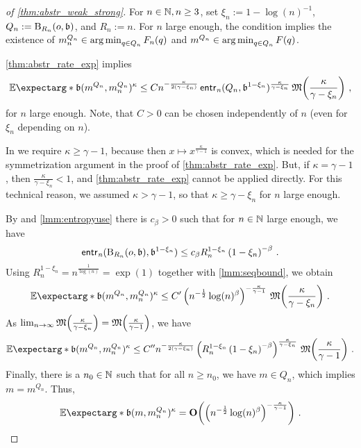 \begin{proof}[of \autoref{thm:abstr_weak_strong}]
	For $n\in\mathbb{N}, n\geq 3$, set $\xi_n := 1 - \log(n)^{-1}$, $Q_n := \operatorname{\mathrm{B}}_{R_n}(o, \mathfrak{b})$, and $R_n := n$.
	For $n$ large enough, the  condition implies the existence of $m^{Q_n}_n \in \operatorname*{arg\,min}_{q\in Q_n} F_n(q)$ and $m^{Q_n}\in\operatorname*{arg\,min}_{q\in Q_n} F(q)$.
	
	\autoref{thm:abstr_rate_exp} implies
	\begin{equation*}
		\Ex*{\mf b(m^{Q_n}, m^{Q_n}_n)^{\kappa}} \leq C n^{-\frac{\kappa}{2(\gamma-\xi_n)}} \entrn(Q_n, \mf b^{1-\xi_n})^{\frac{\kappa}{\gamma-\xi_n}}\, \mf M\brOf{\frac{\kappa}{\gamma-\xi_n}}
		\eqcm
	\end{equation*}
	for $n$ large enough.
	Note, that $C>0$ can be chosen independently of $n$ (even for $\xi_n$ depending on $n$).
	
	In  we require $\kappa \geq \gamma-1$, because then $x\mapsto x^{\frac{\kappa}{\gamma-1}}$ is convex, which is needed for the symmetrization argument in the proof of \autoref{thm:abstr_rate_exp}. But, if $\kappa = \gamma-1$, then $\frac{\kappa}{\gamma-\xi_n} < 1$, and \autoref{thm:abstr_rate_exp} cannot be applied directly. For this technical reason, we assumed $\kappa > \gamma-1$, so that $\kappa \geq \gamma-\xi_n$ for $n$ large enough.	
	
	By  and \autoref{lmm:entropyuse} there is $c_\beta>0$ such that for $n\in\mathbb{N}$ large enough, we have 
	\begin{equation*}
		\operatorname{\mathsf{entr}_\mathit{n}}(\operatorname{\mathrm{B}}_{R_n}(o,\mathfrak{b}), \mathfrak{b}^{1-\xi_n}) \leq c_\beta R_n^{1-\xi_n} \left( {1-\xi_n} \right)^{-\beta}
		\, .
	\end{equation*}
	Using $R_n^{1-\xi_n} = n^{\frac1{\log(n)}} = \exp(1)$ together with \autoref{lmm:seqbound}, we obtain
	\begin{equation*}
		\Ex*{\mf b(m^{Q_n}, m^{Q_n}_n)^\kappa} \leq C\pr \br{n^{-\frac12} \log(n)^\beta}^{-\frac{\kappa}{\gamma-1}} \, \mf M\brOf{\frac{\kappa}{\gamma-\xi_n}}
		\eqfs
	\end{equation*}
	As $\lim_{n\to\infty}\mathfrak{M}\!\left( \frac{\kappa}{\gamma-\xi_n} \right) = \mathfrak{M}\!\left( \frac{\kappa}{\gamma-1} \right)$, we have 
	\begin{equation*}
		\Ex*{\mf b(m^{Q_n}, m^{Q_n}_n)^{\kappa}} \leq C\prr n^{-\frac{\kappa}{2(\gamma-\xi_n)}} \br{R_n^{1-\xi_n} \br{{1-\xi_n}}^{-\beta}}^{\frac{\kappa}{\gamma-\xi_n}}\, \mf M\brOf{\frac{\kappa}{\gamma-1}}
		\eqfs
	\end{equation*}
	Finally, there is a $n_0\in\mathbb{N}$ such that for all $n\geq n_0$, we have $m \in Q_n$, which implies $m = m^{Q_n}$. Thus,
	\begin{equation*}
		\Ex*{\mf b(m, m^{Q_n}_n)^\kappa} = \bigO\brOf{\br{n^{-\frac12} \log(n)^\beta}^{-\frac{\kappa}{\gamma-1}}}
		\eqfs
	\end{equation*}
\end{proof}
%
%
%
